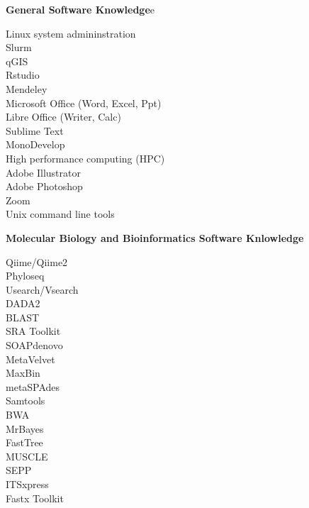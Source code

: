 \documentclass{article}
\begin{document}
\vspace{3mm}

{\large  \textbf{General Software Knowledge}}e
  \begin{adjustwidth}{2mm}{}\begin{multicols}{3}
    Linux system admininstration\\
    Slurm\\
    qGIS\\
    Rstudio\\
    Mendeley\\
    Microsoft Office (Word, Excel, Ppt)\\
    Libre Office (Writer, Calc)\\
    Sublime Text\\
    MonoDevelop\\
    High performance computing (HPC)\\
    Adobe Illustrator\\
    Adobe Photoshop\\
    Zoom\\
    Unix command line tools
  \end{multicols}\end{adjustwidth}

\vspace{3mm}
{\large  \textbf{Molecular Biology and Bioinformatics Software Knlowledge}}
  \begin{adjustwidth}{2mm}{}\begin{multicols}{3}
    Qiime/Qiime2\\
    Phyloseq\\
    Usearch/Vsearch\\
    DADA2\\
    BLAST\\
    SRA Toolkit\\
    SOAPdenovo\\
    MetaVelvet\\
    MaxBin\\
    metaSPAdes\\
    Samtools\\
    BWA\\
    MrBayes\\
    FastTree\\
    MUSCLE\\
    SEPP\\
    ITSxpress\\
    Fastx Toolkit
  \end{multicols}\end{adjustwidth}
\end{document}

